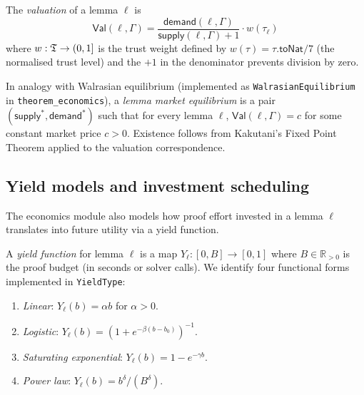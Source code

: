 \documentclass[11pt]{article}
\providecommand{\Val}{\mathsf{Val}}         %
\providecommand{\supp}{\mathsf{supply}}     %
\providecommand{\dem}{\mathsf{demand}}      %
\providecommand{\budget}{B}                 %
\begin{document}
\begin{definition}\label{def:val}
The \emph{valuation} of a lemma $\ell$ is
\[
  \Val(\ell, \Gamma)
  = \frac{\dem(\ell, \Gamma)}{\supp(\ell, \Gamma) + 1}
    \cdot w(\tau_\ell)
\]
where $w : \mathfrak{T} \to (0,1]$ is the trust weight defined by
$w(\tau) = \tau.\mathsf{toNat} / 7$ (the normalised trust level)
and the $+1$ in the denominator prevents division by zero.
\end{definition}

\begin{remark}\label{rem:equilibrium}
In analogy with Walrasian equilibrium (implemented as
\texttt{WalrasianEquilibrium} in \texttt{theorem\_economics}), a
\emph{lemma market equilibrium} is a pair $(\supp^*, \dem^*)$ such
that for every lemma $\ell$, $\Val(\ell, \Gamma) = c$ for some
constant market price $c > 0$.  Existence follows from Kakutani's
Fixed Point Theorem applied to the valuation correspondence.
\end{remark}

\subsection{Yield models and investment scheduling}

The economics module also models how proof effort invested in a lemma
$\ell$ translates into future utility via a yield function.

\begin{definition}\label{def:yield}
A \emph{yield function} for lemma $\ell$ is a map
$Y_\ell : [0, \budget] \to [0,1]$ where $\budget \in \mathbb{R}_{>0}$
is the proof budget (in seconds or solver calls).  We identify four
functional forms implemented in \texttt{YieldType}:
\begin{enumerate}[leftmargin=1.5em]
  \item \emph{Linear}: $Y_\ell(b) = \alpha b$ for $\alpha > 0$.
  \item \emph{Logistic}: $Y_\ell(b) = (1 + e^{-\beta(b - b_0)})^{-1}$.
  \item \emph{Saturating exponential}: $Y_\ell(b) = 1 - e^{-\gamma b}$.
  \item \emph{Power law}: $Y_\ell(b) = b^\delta / (\budget^\delta)$.
\end{enumerate}
\end{definition}
\end{document}

